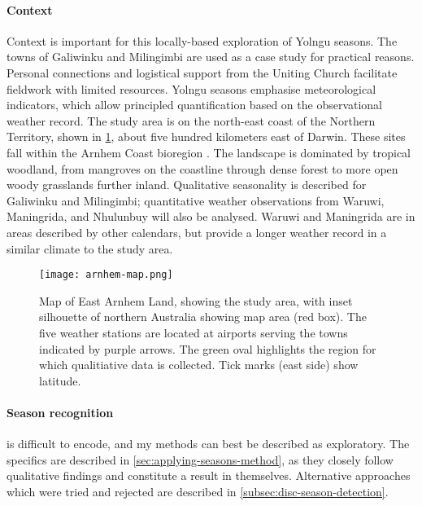 \paragraph{Context}
Context is important for this locally-based exploration of Yolngu seasons.
The towns of Galiwinku and Milingimbi are used as a case study for practical reasons.  Personal connections and
logistical support from the Uniting Church facilitate fieldwork with limited
resources.  Yolngu seasons emphasise meteorological indicators, which allow
principled quantification based on the observational weather record.
%
The study area is on the north-east coast of the Northern Territory, shown
in  \cref{fig:arnhem-map}, about five hundred kilometers east of Darwin.
These sites fall within the Arnhem Coast bioregion \citep{ens2014}.
The landscape is dominated by tropical woodland, from mangroves on the
coastline through dense forest to more open woody grasslands further inland.
Qualitative seasonality is described for Galiwinku and Milingimbi;
quantitative weather observations from Waruwi, Maningrida, and Nhulunbuy
will also be analysed.  Waruwi and Maningrida are in areas described by
other calendars, but provide a longer weather record in a similar climate
to the study area.
%


\begin{figure}[t]
    \centering
    \texttt{[image: arnhem-map.png]}
    \caption[Map of East Arnhem Land, showing the study area]{
        Map of East Arnhem Land, showing the study area, with inset silhouette
        of northern Australia showing map area (red box).  The five weather
        stations are located at airports serving the towns indicated by purple
        arrows.  The green oval highlights the region for which qualitiative
        data is collected.  Tick marks (east side) show latitude.}
    \label{fig:arnhem-map}
\end{figure}



\paragraph{Season recognition} is difficult to encode, and my methods can
best be described as exploratory.  The specifics are described in
\cref{sec:applying-seasons-method}, as they closely follow qualitative
findings and constitute a result in themselves.  Alternative approaches
which were tried and rejected are described in \cref{subsec:disc-season-detection}.

